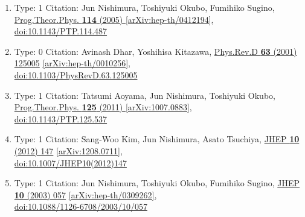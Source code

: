 \documentclass[a4paper,10pt]{article}
\begin{document}
\begin{enumerate}
\begin{enumerate}
  \item Type: 1 Citation: Jun Nishimura, Toshiyuki Okubo, Fumihiko Sugino, \href{https://www.doi.org/10.1143/PTP.114.487}{Prog.Theor.Phys. {\bf 114} (2005) }  \href{https://arxiv.org/abs/hep-th/0412194}{[arXiv:hep-th/0412194]},\\\href{https://www.doi.org/10.1143/PTP.114.487}{doi:10.1143/PTP.114.487}
  \item Type: 0 Citation: Avinash Dhar, Yoshihisa Kitazawa, \href{https://www.doi.org/10.1103/PhysRevD.63.125005}{Phys.Rev.D {\bf 63} (2001) 125005}  \href{https://arxiv.org/abs/hep-th/0010256}{[arXiv:hep-th/0010256]},\\\href{https://www.doi.org/10.1103/PhysRevD.63.125005}{doi:10.1103/PhysRevD.63.125005}
  \item Type: 1 Citation: Tatsumi Aoyama, Jun Nishimura, Toshiyuki Okubo, \href{https://www.doi.org/10.1143/PTP.125.537}{Prog.Theor.Phys. {\bf 125} (2011) }  \href{https://arxiv.org/abs/1007.0883}{[arXiv:1007.0883]},\\\href{https://www.doi.org/10.1143/PTP.125.537}{doi:10.1143/PTP.125.537}
  \item Type: 1 Citation: Sang-Woo Kim, Jun Nishimura, Asato Tsuchiya, \href{https://www.doi.org/10.1007/JHEP10(2012)147}{JHEP {\bf 10} (2012) 147}  \href{https://arxiv.org/abs/1208.0711}{[arXiv:1208.0711]},\\\href{https://www.doi.org/10.1007/JHEP10(2012)147}{doi:10.1007/JHEP10(2012)147}
  \item Type: 1 Citation: Jun Nishimura, Toshiyuki Okubo, Fumihiko Sugino, \href{https://www.doi.org/10.1088/1126-6708/2003/10/057}{JHEP {\bf 10} (2003) 057}  \href{https://arxiv.org/abs/hep-th/0309262}{[arXiv:hep-th/0309262]},\\\href{https://www.doi.org/10.1088/1126-6708/2003/10/057}{doi:10.1088/1126-6708/2003/10/057}

\end{enumerate}
\end{enumerate}
\end{document}

